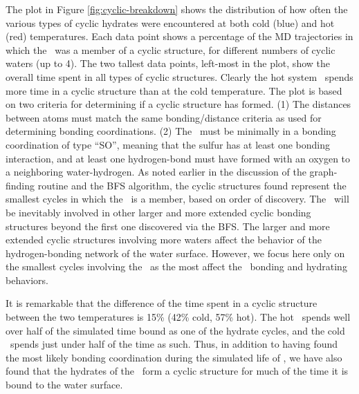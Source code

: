 The plot in Figure \ref{fig:cyclic-breakdown} shows the distribution of how often the various types of cyclic hydrates were encountered at both cold (blue) and hot (red) temperatures. Each data point shows a percentage of the MD trajectories in which the \suldiox~was a member of a cyclic structure, for different numbers of cyclic waters (up to 4). The two tallest data points, left-most in the plot, show the overall time spent in all types of cyclic structures. Clearly the hot system \suldiox~spends more time in a cyclic structure than at the cold temperature. The plot is based on two criteria for determining if a cyclic structure has formed. (1) The distances between atoms must match the same bonding/distance criteria as used for determining bonding coordinations. (2) The \suldiox~must be minimally in a bonding coordination of type ``SO'', meaning that the sulfur has at least one bonding interaction, and at least one hydrogen-bond must have formed with an oxygen to a neighboring water-hydrogen. As noted earlier in the discussion of the graph-finding routine and the BFS algorithm, the cyclic structures found represent the smallest cycles in which the \suldiox~is a member, based on order of discovery. The \suldiox~will be inevitably involved in other larger and more extended cyclic bonding structures beyond the first one discovered via the BFS. The larger and more extended cyclic structures involving more waters affect the behavior of the hydrogen-bonding network of the water surface. However, we focus here only on the smallest cycles involving the \suldiox~as the most affect the \suldiox~bonding and hydrating behaviors.

It is remarkable that the difference of the time spent in a cyclic structure between the two temperatures is 15\% (42\% cold, 57\% hot). The hot \suldiox~spends well over half of the simulated time bound as one of the hydrate cycles, and the cold \suldiox~spends just under half of the time as such. Thus, in addition to having found the most likely bonding coordination during the simulated life of \suldiox, we have also found that the hydrates of the \suldiox~form a cyclic structure for much of the time it is bound to the water surface.

